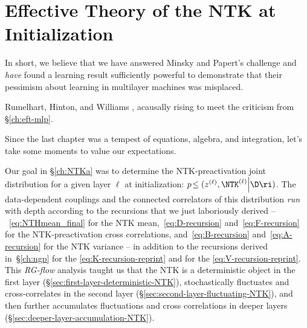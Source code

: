 
\chapter{Effective Theory of the NTK at Initialization}\label{ch:eft-ntk}%

\epigraph{
In short, we believe that we have answered Minsky and Papert's challenge and \emph{have} found a learning result sufficiently powerful to demonstrate that their pessimism about learning in multilayer machines was misplaced.
}{Rumelhart, Hinton, and Williams \cite{rumelhart1985learning}, acausally
rising to meet the criticism
from \S\ref{ch:eft-mlp}.
 }



\noindent{}Since the last chapter was a tempest of equations, algebra, and integration,
let's take some moments
to 
value 
our expectations.

Our goal in \S\ref{ch:NTKa} was to determine the NTK-preactivation joint distribution  for a given layer $\ell$ at initialization: $p\!\le(z^{(\ell)}, \NTK^{(\ell)}\Big\vert\D\ri)$. The data-dependent couplings and the connected correlators of this distribution \emph{run} with depth according to the recursions that we just laboriously derived --~\eqref{eq:NTHmean_final} for the NTK mean,~\eqref{eq:D-recursion} and~\eqref{eq:F-recursion} for the NTK-preactivation cross correlations, and~\eqref{eq:B-recursion} and~\eqref{eq:A-recursion} for the NTK variance -- in addition to the recursions derived in~\S\ref{ch:ngp} 
for the  \eqref{eq:K-recursion-reprint} and for the  \eqref{eq:V-recursion-reprint}.
This \emph{RG-flow} analysis taught us that the NTK is a deterministic object in the first layer (\S\ref{sec:first-layer-deterministic-NTK}),
stochastically fluctuates and cross-correlates in the second layer (\S\ref{sec:second-layer-fluctuating-NTK}),
and then further accumulates fluctuations and cross correlations in deeper layers (\S\ref{sec:deeper-layer-accumulation-NTK}).




